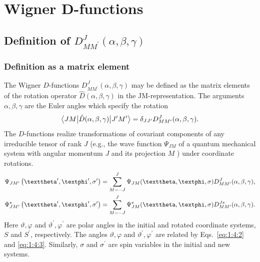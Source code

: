 \chapter{Wigner D-functions}\label{chap:4}
\section{Definition of $D_{M M^{\prime}}^{J}(\alpha, \beta, \gamma)$}\label{sec:4.1}
\subsection{Definition as a matrix element}
The Wigner $D$-functions $D_{M M^{\prime}}^{J}(\alpha, \beta, \gamma)$ may be defined as the matrix elements of the rotation operator $\widehat{D}(\alpha, \beta, \gamma)$ in the JM-representation. The arguments $\alpha, \beta, \gamma$ are the Euler angles which specify the rotation
\begin{equation}
\bigl\langle J M \big| \hat{D}(\alpha, \beta, \gamma) \big| J^{\prime} M^{\prime} \bigr\rangle=\delta_{J J^{\prime}} D_{M M^{\prime}}^{J}(\alpha, \beta, \gamma). \label{eq:4:1:1}
\end{equation}
The $D$-functions realize transformations of covariant components of any irreducible tensor of rank $J$ (e.g., the wave function $\Psi_{J M}$ of a quantum mechanical system with angular momentum $J$ and its projection $M$ ) under coordinate rotations.
\begin{align}
& \Psi_{J M^{\prime}}\left(\vartheta^{\prime}, \varphi^{\prime}, \sigma^{\prime}\right)=\sum_{M=-J}^{J} \Psi_{J M}(\vartheta, \varphi, \sigma) D_{M M^{\prime}}^{J}(\alpha, \beta, \gamma),  \notag\\
& \Psi_{J M^{\prime}}^{*}\left(\vartheta^{\prime}, \varphi^{\prime}, \sigma^{\prime}\right)=\sum_{M=-J}^{J} \Psi_{J M}^{*}(\vartheta, \varphi, \sigma) D_{M M^{\prime}}^{J *}(\alpha, \beta, \gamma) . \label{eq:4:1:2}
\end{align}
Here $\vartheta, \varphi$ and $\vartheta^{\prime}, \varphi^{\prime}$ are polar angles in the initial and rotated coordinate systems, $S$ and $S^{\prime}$, respectively. The angles $\vartheta, \varphi$ and $\vartheta^{\prime}, \varphi^{\prime}$ are related by Eqs.~\eqref{eq:1:4:2} and \eqref{eq:1:4:3}. Similarly, $\sigma$ and $\sigma^{\prime}$ are spin variables in the initial and new systems.

